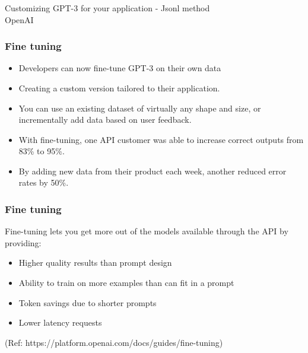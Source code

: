 \begin{frame}[fragile]\frametitle{}
\begin{center}
{\Large Customizing GPT-3 for your application - Jsonl method\\ OpenAI}
\end{center}
\end{frame}

\begin{frame}[fragile]\frametitle{Fine tuning}

\begin{itemize}
\item Developers can now fine-tune GPT-3 on their own data
\item Creating a custom version tailored to their application.
\item You can use an existing dataset of virtually any shape and size, or incrementally add data based on user feedback. 
\item With fine-tuning, one API customer was able to increase correct outputs from 83\% to 95\%. 
\item By adding new data from their product each week, another reduced error rates by 50\%.
\end{itemize}	 

\end{frame}

\begin{frame}[fragile]\frametitle{Fine tuning}

Fine-tuning lets you get more out of the models available through the API by providing:

\begin{itemize}
\item Higher quality results than prompt design
\item Ability to train on more examples than can fit in a prompt
\item Token savings due to shorter prompts
\item Lower latency requests
\end{itemize}	 


{\tiny (Ref: https://platform.openai.com/docs/guides/fine-tuning)}
\end{frame}

